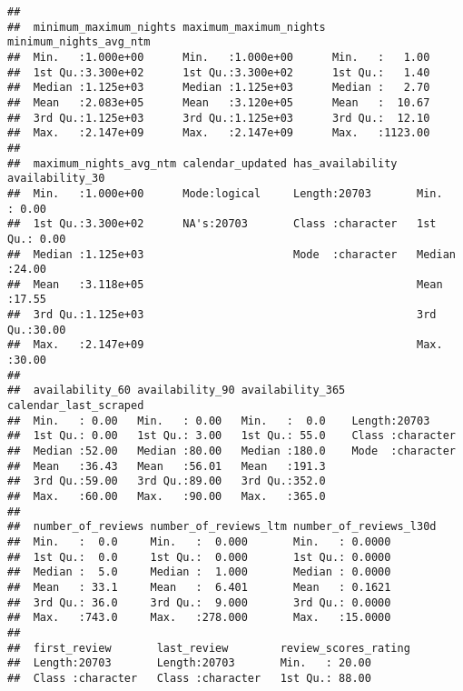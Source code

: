 \begin{verbatim}
##                                                                   
##  minimum_maximum_nights maximum_maximum_nights minimum_nights_avg_ntm
##  Min.   :1.000e+00      Min.   :1.000e+00      Min.   :   1.00       
##  1st Qu.:3.300e+02      1st Qu.:3.300e+02      1st Qu.:   1.40       
##  Median :1.125e+03      Median :1.125e+03      Median :   2.70       
##  Mean   :2.083e+05      Mean   :3.120e+05      Mean   :  10.67       
##  3rd Qu.:1.125e+03      3rd Qu.:1.125e+03      3rd Qu.:  12.10       
##  Max.   :2.147e+09      Max.   :2.147e+09      Max.   :1123.00       
##                                                                      
##  maximum_nights_avg_ntm calendar_updated has_availability   availability_30
##  Min.   :1.000e+00      Mode:logical     Length:20703       Min.   : 0.00  
##  1st Qu.:3.300e+02      NA's:20703       Class :character   1st Qu.: 0.00  
##  Median :1.125e+03                       Mode  :character   Median :24.00  
##  Mean   :3.118e+05                                          Mean   :17.55  
##  3rd Qu.:1.125e+03                                          3rd Qu.:30.00  
##  Max.   :2.147e+09                                          Max.   :30.00  
##                                                                            
##  availability_60 availability_90 availability_365 calendar_last_scraped
##  Min.   : 0.00   Min.   : 0.00   Min.   :  0.0    Length:20703         
##  1st Qu.: 0.00   1st Qu.: 3.00   1st Qu.: 55.0    Class :character     
##  Median :52.00   Median :80.00   Median :180.0    Mode  :character     
##  Mean   :36.43   Mean   :56.01   Mean   :191.3                         
##  3rd Qu.:59.00   3rd Qu.:89.00   3rd Qu.:352.0                         
##  Max.   :60.00   Max.   :90.00   Max.   :365.0                         
##                                                                        
##  number_of_reviews number_of_reviews_ltm number_of_reviews_l30d
##  Min.   :  0.0     Min.   :  0.000       Min.   : 0.0000       
##  1st Qu.:  0.0     1st Qu.:  0.000       1st Qu.: 0.0000       
##  Median :  5.0     Median :  1.000       Median : 0.0000       
##  Mean   : 33.1     Mean   :  6.401       Mean   : 0.1621       
##  3rd Qu.: 36.0     3rd Qu.:  9.000       3rd Qu.: 0.0000       
##  Max.   :743.0     Max.   :278.000       Max.   :15.0000       
##                                                                
##  first_review       last_review        review_scores_rating
##  Length:20703       Length:20703       Min.   : 20.00      
##  Class :character   Class :character   1st Qu.: 88.00      

\end{verbatim}
